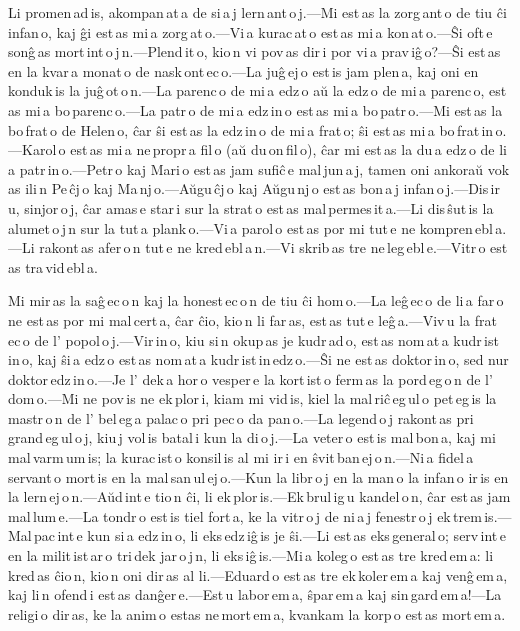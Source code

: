
Li promen\,ad\,is, akompan\,at\,a de si\,a\,j lern\,ant\,o\,j.---Mi est\,as la zorg\,ant\,o de tiu ĉi infan\,o, kaj ĝi est\,as mi\,a zorg\,at\,o.---Vi\,a kurac\,at\,o est\,as mi\,a kon\,at\,o.---Ŝi oft\,e sonĝ\,as mort\,int\,o\,j\,n.---Plend\,it\,o, kio\,n vi pov\,as dir\,i por vi\,a prav\,iĝ\,o?---Ŝi est\,as en la kvar\,a monat\,o de nask\,ont\,ec\,o.---La juĝ\,ej\,o est\,is jam plen\,a, kaj oni en\,konduk\,is la juĝ\,ot\,o\,n.---La parenc\,o de mi\,a edz\,o aŭ la edz\,o de mi\,a parenc\,o, est\,as mi\,a bo\,parenc\,o.---La patr\,o de mi\,a edz\,in\,o est\,as mi\,a bo\,patr\,o.---Mi est\,as la bo\,frat\,o de Helen\,o, ĉar ŝi est\,as la edz\,in\,o de mi\,a frat\,o; ŝi est\,as mi\,a bo\,frat\,in\,o.---Karol\,o est\,as mi\,a ne\,propr\,a fil\,o (aŭ du\,on\,fil\,o), ĉar mi est\,as la du\,a edz\,o de li\,a patr\,in\,o.---Petr\,o kaj Mari\,o est\,as jam sufiĉ\,e mal\,jun\,a\,j, tamen oni ankoraŭ vok\,as ili\,n Pe\,ĉj\,o kaj Ma\,nj\,o.---Aŭgu\,ĉj\,o kaj Aŭgu\,nj\,o est\,as bon\,a\,j infan\,o\,j.---Dis\,ir\,u, sinjor\,o\,j, ĉar amas\,e star\,i sur la strat\,o est\,as mal\,permes\,it\,a.---Li dis\,ŝut\,is la alumet\,o\,j\,n sur la tut\,a plank\,o.---Vi\,a parol\,o est\,as por mi tut\,e ne kompren\,ebl\,a.---Li rakont\,as afer\,o\,n tut\,e ne kred\,ebl\,a\,n.---Vi skrib\,as tre ne\,leg\,ebl\,e.---Vitr\,o est\,as tra\,vid\,ebl\,a. 



Mi mir\,as la saĝ\,ec\,o\,n kaj la honest\,ec\,o\,n de tiu ĉi hom\,o.---La leĝ\,ec\,o de li\,a far\,o ne est\,as por mi mal\,cert\,a, ĉar ĉio, kio\,n li far\,as, est\,as tut\,e leĝ\,a.---Viv\,u la frat\,ec\,o de l' popol\,o\,j.---Vir\,in\,o, kiu si\,n okup\,as je kudr\,ad\,o, est\,as nom\,at\,a kudr\,ist\,in\,o, kaj ŝi\,a edz\,o est\,as nom\,at\,a kudr\,ist\,in\,edz\,o.---Ŝi ne est\,as doktor\,in\,o, sed nur doktor\,edz\,in\,o.---Je l' dek\,a hor\,o vesper\,e la kort\,ist\,o ferm\,as la pord\,eg\,o\,n de l' dom\,o.---Mi ne pov\,is ne ek\,plor\,i, kiam mi vid\,is, kiel la mal\,riĉ\,eg\,ul\,o pet\,eg\,is la mastr\,o\,n de l' bel\,eg\,a palac\,o pri pec\,o da pan\,o.---La legend\,o\,j rakont\,as pri grand\,eg\,ul\,o\,j, kiu\,j vol\,is batal\,i kun la di\,o\,j.---La veter\,o est\,is mal\,bon\,a, kaj mi mal\,varm\,um\,is; la kurac\,ist\,o konsil\,is al mi ir\,i en ŝvit\,ban\,ej\,o\,n.---Ni\,a fidel\,a servant\,o mort\,is en la mal\,san\,ul\,ej\,o.---Kun la libr\,o\,j en la man\,o la infan\,o ir\,is en la lern\,ej\,o\,n.---Aŭd\,int\,e tio\,n ĉi, li ek\,plor\,is.---Ek\,brul\,ig\,u kandel\,o\,n, ĉar est\,as jam mal\,lum\,e.---La tondr\,o est\,is tiel fort\,a, ke la vitr\,o\,j de ni\,a\,j fenestr\,o\,j ek\,trem\,is.---Mal\,pac\,int\,e kun si\,a edz\,in\,o, li eks\,edz\,iĝ\,is je ŝi.---Li est\,as eks\,general\,o; serv\,int\,e en la milit\,ist\,ar\,o tri\,dek jar\,o\,j\,n, li eks\,iĝ\,is.---Mi\,a koleg\,o est\,as tre kred\,em\,a: li kred\,as ĉio\,n, kio\,n oni dir\,as al li.---Eduard\,o est\,as tre ek\,koler\,em\,a kaj venĝ\,em\,a, kaj li\,n ofend\,i est\,as danĝer\,e.---Est\,u labor\,em\,a, ŝpar\,em\,a kaj sin\,gard\,em\,a!---La religi\,o dir\,as, ke la anim\,o estas ne\,mort\,em\,a, kvankam la korp\,o est\,as mort\,em\,a. 


